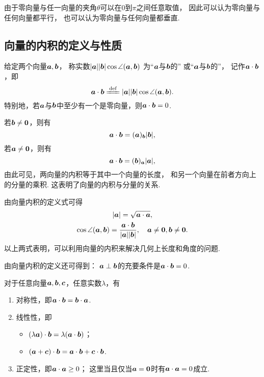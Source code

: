 由于零向量与任一向量的夹角\(\theta\)可以在\(0\)到\(\pi\)之间任意取值，
因此可以认为零向量与任何向量都平行，
也可以认为零向量与任何向量都垂直.

\subsection{向量的内积的定义与性质}
\begin{definition}
给定两个向量\(\boldsymbol{a},\boldsymbol{b}\)，
称实数\(\abs{\boldsymbol{a}} \abs{\boldsymbol{b}} \cos\angle(\boldsymbol{a},\boldsymbol{b})\)
为“\(\boldsymbol{a}\)与\(\boldsymbol{b}\)的”
或“\(\boldsymbol{a}\)与\(\boldsymbol{b}\)的”，
记作\(\boldsymbol{a} \cdot \boldsymbol{b}\)，即
\begin{equation}
	\mat{a} \cdot \mat{b}
	\defeq
	\abs{\mat{a}} \abs{\mat{b}} \cos\angle(\mat{a},\mat{b}).
\end{equation}
特别地，若\(\boldsymbol{a}\)与\(\boldsymbol{b}\)中至少有一个是零向量，则\(\boldsymbol{a}\cdot\boldsymbol{b}=0\).
\end{definition}

若\(\boldsymbol{b}\neq\boldsymbol{0}\)，则有
\begin{equation}
	\boldsymbol{a}\cdot\boldsymbol{b}
	= (\boldsymbol{a})_{\boldsymbol{b}} \abs{\boldsymbol{b}},
\end{equation}
若\(\boldsymbol{a}\neq\boldsymbol{0}\)，则有
\begin{equation}
	\boldsymbol{a}\cdot\boldsymbol{b}
	= (\boldsymbol{b})_{\boldsymbol{a}} \abs{\boldsymbol{a}},
\end{equation}
由此可见，两向量的内积等于其中一个向量的长度，
和另一个向量在前者方向上的分量的乘积.
这表明了向量的内积与分量的关系.

由向量内积的定义式可得
\begin{gather}
	\abs{\boldsymbol{a}} = \sqrt{\boldsymbol{a}\cdot\boldsymbol{a}}, \\
	\cos\angle(\boldsymbol{a},\boldsymbol{b}) = \frac{\boldsymbol{a}\cdot\boldsymbol{b}}{\abs{\boldsymbol{a}} \abs{\boldsymbol{b}}},
	\quad \boldsymbol{a}\neq\boldsymbol{0},\boldsymbol{b}\neq\boldsymbol{0}.
\end{gather}
以上两式表明，可以利用向量的内积来解决几何上长度和角度的问题.

由向量内积的定义还可得到：
\(\boldsymbol{a}\perp\boldsymbol{b}\)的充要条件是\(\boldsymbol{a}\cdot\boldsymbol{b}=0\).

\begin{theorem}
对于任意向量\(\boldsymbol{a},\boldsymbol{b},\boldsymbol{c}\)，任意实数\(\lambda\)，有\begin{enumerate}
	\item 对称性，即\(\boldsymbol{a}\cdot\boldsymbol{b} = \boldsymbol{b}\cdot\boldsymbol{a}\).
	\item 线性性，即\begin{itemize}
		\item \((\lambda\boldsymbol{a})\cdot\boldsymbol{b}=\lambda(\boldsymbol{a}\cdot\boldsymbol{b})\)；
		\item \((\boldsymbol{a}+\boldsymbol{c})\cdot\boldsymbol{b}=\boldsymbol{a}\cdot\boldsymbol{b}+\boldsymbol{c}\cdot\boldsymbol{b}\).
	\end{itemize}
	\item 正定性，即\(\boldsymbol{a}\cdot\boldsymbol{a}\geq0\)；
	这里当且仅当\(\boldsymbol{a}=\boldsymbol{0}\)时有\(\boldsymbol{a}\cdot\boldsymbol{a}=0\)成立.
\end{enumerate}
\end{theorem}

